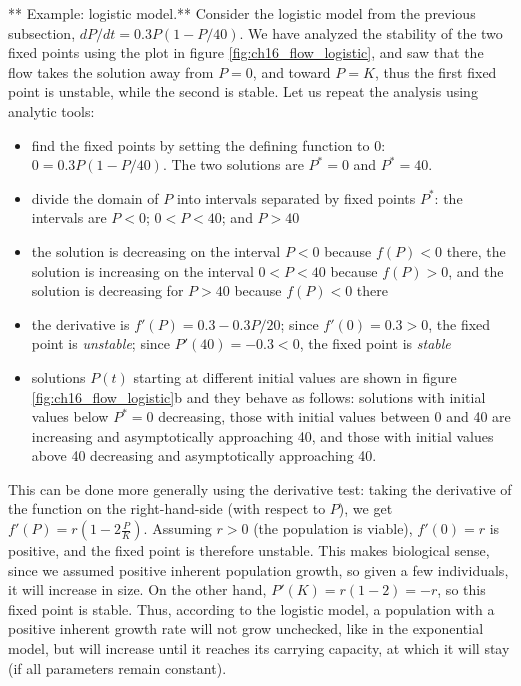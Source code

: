 \documentclass[
]{book}
\theoremstyle{definition}
\theoremstyle{definition}
\theoremstyle{definition}
\theoremstyle{remark}
\begin{document}
** Example: logistic model.**  Consider the logistic model from the previous subsection, \(dP/dt =0.3P(1-P/40)\). We have analyzed the stability of the two fixed points using the plot in figure \ref{fig:ch16_flow_logistic}, and saw that the flow takes the solution away from \(P=0\), and toward \(P=K\), thus the first fixed point is unstable, while the second is stable. Let us repeat the analysis using analytic tools:

\begin{itemize}
\item
  find the fixed points by setting the defining function to 0: \(0 = 0.3P(1-P/40)\). The two solutions are \(P^*=0\) and \(P^*=40\).
\item
  divide the domain of \(P\) into intervals separated by fixed points \(P^*\): the intervals are \(P<0\); \(0<P<40\); and \(P>40\)
\item
  the solution is decreasing on the interval \(P<0\) because \(f(P)<0\) there, the solution is increasing on the interval \(0<P<40\) because \(f(P)>0\), and the solution is decreasing for \(P>40\) because \(f(P)<0\) there
\item
  the derivative is \(f'(P)=0.3-0.3P/20\); since \(f'(0)=0.3 > 0\), the fixed point is \emph{unstable}; since \(P'(40)=-0.3<0\), the fixed point is \emph{stable}
\item
  solutions \(P(t)\) starting at different initial values are shown in figure \ref{fig:ch16_flow_logistic}b and they behave as follows: solutions with initial values below \(P^*=0\) decreasing, those with initial values between 0 and 40 are increasing and asymptotically approaching 40, and those with initial values above 40 decreasing and asymptotically approaching 40.
\end{itemize}

This can be done more generally using the derivative test: taking the derivative of the function on the right-hand-side (with respect to \(P\)), we get \(f'(P) = r(1-2\frac{P}{K})\). Assuming \(r>0\) (the population is viable), \(f'(0)= r\) is positive, and the fixed point is therefore unstable. This makes biological sense, since we assumed positive inherent population growth, so given a few individuals, it will increase in size. On the other hand, \(P'(K) = r(1-2) = -r\), so this fixed point is stable. Thus, according to the logistic model, a population with a positive inherent growth rate will not grow unchecked, like in the exponential model, but will increase until it reaches its carrying capacity, at which it will stay (if all parameters remain constant).
\end{document}
